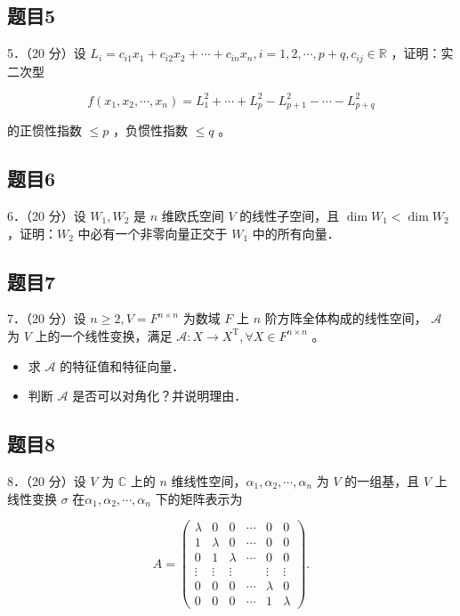 \documentclass{article}
\begin{document}
\subsection{题目5}
5．（20 分）设 \(L_{i}=c_{i 1} x_{1}+c_{i 2} x_{2}+\cdots+c_{i n} x_{n}, i=1,2, \cdots, p+q, c_{i j} \in \mathbb{R}\) ，证明：实二次型

\[
f\left(x_{1}, x_{2}, \cdots, x_{n}\right)=L_{1}^{2}+\cdots+L_{p}^{2}-L_{p+1}^{2}-\cdots-L_{p+q}^{2}
\]

的正惯性指数 \(\leq p\) ，负惯性指数 \(\leq q\) 。

\subsection{题目6}
6．（20 分）设 \(W_{1}, W_{2}\) 是 \(n\) 维欧氏空间 \(V\) 的线性子空间，且 \(\operatorname{dim} W_{1}<\operatorname{dim} W_{2}\) ，证明：\(W_{2}\) 中必有一个非零向量正交于 \(W_{1}\) 中的所有向量．

\subsection{题目7}
7．（20 分）设 \(n \geq 2, V=F^{n \times n}\) 为数域 \(F\) 上 \(n\) 阶方阵全体构成的线性空间， \(\mathcal{A}\) 为 \(V\) 上的一个线性变换，满足 \(\mathcal{A}: X \rightarrow X^{\mathrm{T}}, \forall X \in F^{n \times n}\) 。

\begin{itemize}
  \item[（1）] 求 \(\mathcal{A}\) 的特征值和特征向量．
  \item[（2）] 判断 \(\mathcal{A}\) 是否可以对角化？并说明理由．
\end{itemize}

\subsection{题目8}
8．（20 分）设 \(V\) 为 \(\mathbb{C}\) 上的 \(n\) 维线性空间，\(\alpha_{1}, \alpha_{2}, \cdots, \alpha_{n}\) 为 \(V\) 的一组基，且 \(V\) 上线性变换 \(\sigma\) 在\(\alpha_{1}, \alpha_{2}, \cdots, \alpha_{n}\) 下的矩阵表示为

\[
A=\left(\begin{array}{cccccc}
\lambda & 0 & 0 & \cdots & 0 & 0 \\
1 & \lambda & 0 & \cdots & 0 & 0 \\
0 & 1 & \lambda & \cdots & 0 & 0 \\
\vdots & \vdots & \vdots & & \vdots & \vdots \\
0 & 0 & 0 & \cdots & \lambda & 0 \\
0 & 0 & 0 & \cdots & 1 & \lambda
\end{array}\right) .
\]
\end{document}
